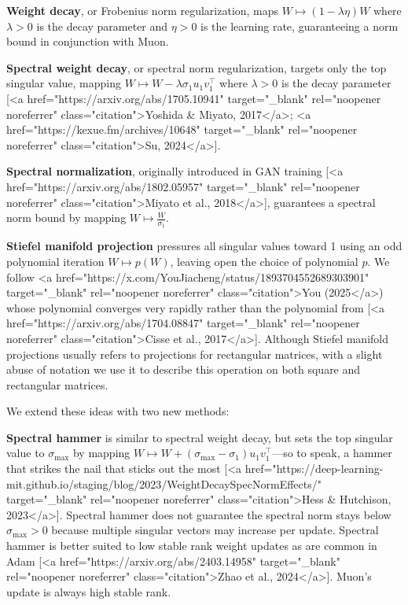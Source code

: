 \textbf{Weight decay}, or Frobenius norm regularization, maps $W \mapsto (1 - \lambda \eta)W$ where $\lambda > 0$ is the decay parameter and $\eta > 0$ is the learning rate, guaranteeing a norm bound in conjunction with Muon.

\textbf{Spectral weight decay}, or spectral norm regularization, targets only the top singular value, mapping $W \mapsto W - \lambda \sigma_1 u_1 v_1^\top$ where $\lambda > 0$ is the decay parameter [<a href="https://arxiv.org/abs/1705.10941" target="_blank" rel="noopener noreferrer" class="citation">Yoshida & Miyato, 2017</a>; <a href="https://kexue.fm/archives/10648" target="_blank" rel="noopener noreferrer" class="citation">Su, 2024</a>].

\textbf{Spectral normalization}, originally introduced in GAN training [<a href="https://arxiv.org/abs/1802.05957" target="_blank" rel="noopener noreferrer" class="citation">Miyato et al., 2018</a>], guarantees a spectral norm bound by mapping $W \mapsto \tfrac{W}{\sigma_1}$.

\textbf{Stiefel manifold projection} pressures all singular values toward 1 using an odd polynomial iteration $W \mapsto p(W)$, leaving open the choice of polynomial $p$. We follow <a href="https://x.com/YouJiacheng/status/1893704552689303901" target="_blank" rel="noopener noreferrer" class="citation">You (2025</a>) whose polynomial converges very rapidly rather than the polynomial from [<a href="https://arxiv.org/abs/1704.08847" target="_blank" rel="noopener noreferrer" class="citation">Cisse et al., 2017</a>]. Although Stiefel manifold projections usually refers to projections for rectangular matrices, with a slight abuse of notation we use it to describe this operation on both square and rectangular matrices.

\vspace{1em}

We extend these ideas with two new methods:

\vspace{1em}

\textbf{Spectral hammer} is similar to spectral weight decay, but sets the top singular value to $\sigma_\text{max}$ by mapping $W \mapsto W + (\sigma_\text{max} - \sigma_1)u_1v_1^\top$---so to speak, a hammer that strikes the nail that sticks out the most [<a href="https://deep-learning-mit.github.io/staging/blog/2023/WeightDecaySpecNormEffects/" target="_blank" rel="noopener noreferrer" class="citation">Hess & Hutchison, 2023</a>]. Spectral hammer does not guarantee the spectral norm stays below $\sigma_\text{max} > 0$ because multiple singular vectors may increase per update. Spectral hammer is better suited to low stable rank weight updates as are common in Adam [<a href="https://arxiv.org/abs/2403.14958" target="_blank" rel="noopener noreferrer" class="citation">Zhao et al., 2024</a>]. Muon's update is always high stable rank.

